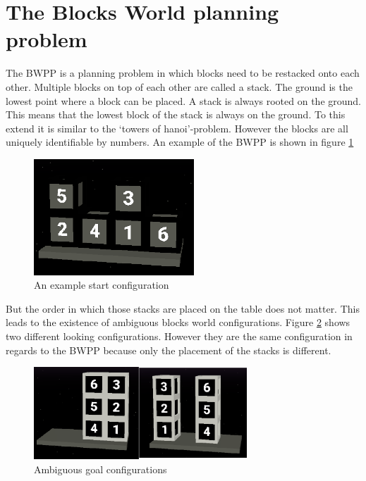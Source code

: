 \documentclass[runningheads]{llncs}
\begin{document}
    \section{The Blocks World planning problem}
        The BWPP is a planning problem in which blocks need to be restacked onto each other.
        Multiple blocks on top of each other are called a stack.
        The ground is the lowest point where a block can be placed.
        A stack is always rooted on the ground.
        This means that the lowest block of the stack is always on the ground.
        To this extend it is similar to the `towers of hanoi'-problem.
        However the blocks are all uniquely identifiable by numbers.
        An example of the BWPP is shown in figure \ref{startConfiguration}

        \begin{figure}[h]
            \centering
            \includegraphics[width=6cm]{start_config.png}
            \caption{An example start configuration}
            \label{startConfiguration}
        \end{figure}

        But the order in which those stacks are placed on the table does not matter.
        This leads to the existence of ambiguous blocks world configurations.
        Figure \ref{ambiguousGoalConfig} shows two different looking configurations.
        However they are the same configuration in regards to the BWPP because only the placement of the stacks is different.
        
        \begin{figure}[h]
            \centering
            \includegraphics[width=8cm]{ambiguous_goal_config.png}
            \caption{Ambiguous goal configurations}
            \label{ambiguousGoalConfig}
        \end{figure}
\end{document}
